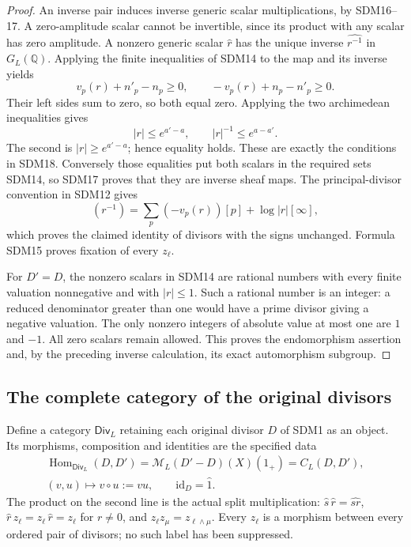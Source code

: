 \begin{proof}
An inverse pair induces inverse generic scalar multiplications, by
SDM16--17. A zero-amplitude scalar cannot be invertible, since its
product with any scalar has zero amplitude. A nonzero generic
scalar $\widehat r$ has the unique inverse
$\widehat{r^{-1}}$ in $G_L(\mathbb Q)$. Applying the finite
inequalities of SDM14 to the map and its inverse yields
\[
v_p(r)+n'_p-n_p\ge0,\qquad
-v_p(r)+n_p-n'_p\ge0.
\]
Their left sides sum to zero, so both equal zero. Applying the
two archimedean inequalities gives
\[
|r|\le e^{a'-a},\qquad
|r|^{-1}\le e^{a-a'}.
\]
The second is $|r|\ge e^{a'-a}$; hence equality holds. These are
exactly the conditions in SDM18. Conversely those equalities
put both scalars in the required sets SDM14, so SDM17 proves
that they are inverse sheaf maps. The principal-divisor convention
in SDM12 gives
\[
(r^{-1})=\sum_p(-v_p(r))[p]+\log|r|[\infty],
\]
which proves the claimed identity of divisors with the signs
unchanged. Formula SDM15 proves fixation of every $z_\ell$.

For $D'=D$, the nonzero scalars in SDM14 are rational numbers
with every finite valuation nonnegative and with $|r|\le1$.
Such a rational number is an integer: a reduced denominator
greater than one would have a prime divisor giving a negative
valuation. The only nonzero integers of absolute value at most
one are $1$ and $-1$. All zero scalars remain allowed.
This proves the endomorphism assertion and, by the preceding
inverse calculation, its exact automorphism subgroup.
\end{proof}

\subsection{The complete category of the original divisors}
\label{sec:sdm-divisor-category}

Define a category $\mathsf{Div}_L$ retaining each original divisor
$D$ of SDM1 as an object. Its morphisms, composition and identities
are the specified data
\begin{equation}\tag{SDM20}
\begin{gathered}
\operatorname{Hom}_{\mathsf{Div}_L}(D,D')
   =\mathcal M_L(D'-D)(X)(1_+)=C_L(D,D'),\\
(v,u)\longmapsto v\circ u:=vu,\qquad
\mathrm{id}_D=\widehat1.
\end{gathered}
\end{equation}
The product on the second line is the actual split multiplication:
$\widehat s\,\widehat r=\widehat{sr}$,
$\widehat r\,z_\ell=z_\ell\,\widehat r=z_\ell$ for $r\ne0$,
and $z_\ell z_\mu=z_{\ell\wedge\mu}$.
Every $z_\ell$ is a morphism between every ordered pair of divisors;
no such label has been suppressed.


